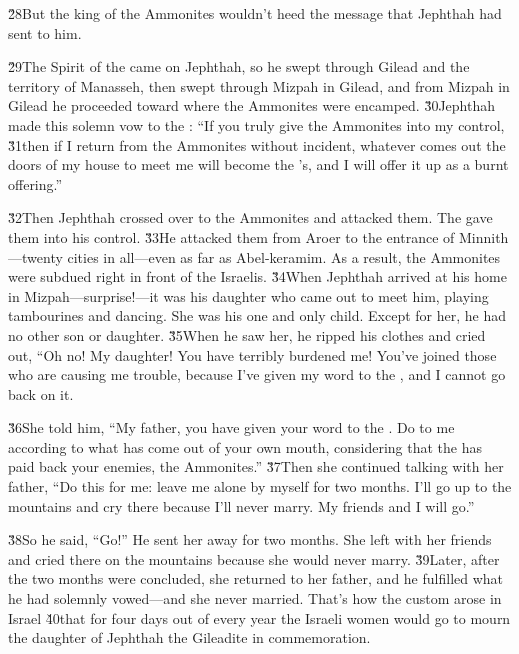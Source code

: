 \v{28}But the king of the Ammonites wouldn't heed the message that Jephthah had sent to him.

\v{29}The Spirit of the  came on Jephthah, so he swept through Gilead and the territory of Manasseh, then swept through Mizpah in Gilead, and from Mizpah in Gilead he proceeded toward where the Ammonites were encamped. \v{30}Jephthah made this solemn vow to the : ``If you truly give the Ammonites into my control, \v{31}then if I return from the Ammonites without incident, whatever comes out the doors of my house to meet me will become the 's, and I will offer it up as a burnt offering.''

\v{32}Then Jephthah crossed over to the Ammonites and attacked them. The  gave them into his control. \v{33}He attacked them from Aroer to the entrance of Minnith---twenty cities in all---even as far as Abel-keramim. As a result, the Ammonites were subdued right in front of the Israelis. \v{34}When Jephthah arrived at his home in Mizpah---surprise!---it was his daughter who came out to meet him, playing tambourines and dancing. She was his one and only child. Except for her, he had no other son or daughter. \v{35}When he saw her, he ripped his clothes and cried out, ``Oh no! My daughter! You have terribly burdened me! You've joined those who are causing me trouble, because I've given my word to the , and I cannot go back on it.

\v{36}She told him, ``My father, you have given your word to the . Do to me according to what has come out of your own mouth, considering that the  has paid back your enemies, the Ammonites.'' \v{37}Then she continued talking with her father, ``Do this for me: leave me alone by myself for two months. I'll go up to the mountains and cry there because I'll never marry. My friends and I will go.''

\v{38}So he said, ``Go!'' He sent her away for two months. She left with her friends and cried there on the mountains because she would never marry. \v{39}Later, after the two months were concluded, she returned to her father, and he fulfilled what he had solemnly vowed---and she never married. That's how the custom arose in Israel \v{40}that for four days out of every year the Israeli women would go to mourn the daughter of Jephthah the Gileadite in commemoration.

